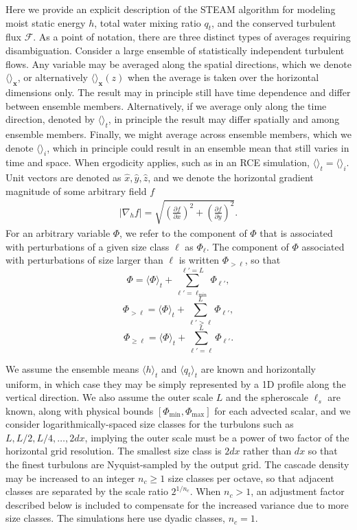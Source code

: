 \documentclass[acp, manuscript, english]{copernicus}
\begin{document}
Here we provide an explicit description of the STEAM algorithm for modeling moist static energy $h$, total water mixing ratio $q_t$, and the conserved turbulent flux $\mathcal{F}$.
As a point of notation, there are three distinct types of averages requiring disambiguation. Consider a large ensemble of statistically independent turbulent flows. Any variable may be averaged along the spatial directions, which we denote $\langle \rangle_\mathbf{x}$, or alternatively $\langle \rangle_\mathbf{x}(z)$ when the average is taken over the horizontal dimensions only. The result may in principle still have time dependence and differ between ensemble members. Alternatively, if we average only along the time direction, denoted by $\langle \rangle_t$, in principle the result may differ spatially and among ensemble members. Finally, we might average across ensemble members, which we denote $\langle \rangle_i$, which in principle could result in an ensemble mean that still varies in time and space. When ergodicity applies, such as in an RCE simulation, $\langle \rangle_t=\langle \rangle_i$. Unit vectors are denoted as $\hat{x}, \hat{y}, \hat{z}$, and we denote the horizontal gradient magnitude of some arbitrary field $f$
\begin{align}
  |\nabla_h f| = \sqrt{\left(\frac{\partial f}{\partial x}\right)^2 + \left(\frac{\partial f}{\partial y}\right)^2}.
\end{align}
For an arbitrary variable $\Phi$, we refer to the component of $\Phi$ that is associated with perturbations of a given size class $\ell$ as $\Phi_\ell$. The component of $\Phi$ associated with perturbations of size larger than $\ell$ is written $\Phi_{>\ell}$, so that 
$$\Phi = \langle \Phi \rangle_t + \sum_{\ell'=\ell_\text{min}}^{\ell'=L} \Phi_{\ell'},$$
$$\Phi_{>\ell} = \langle \Phi \rangle_t + \sum_{\ell'>\ell}^{L} \Phi_{\ell'} ,$$
$$\Phi_{\ge\ell} = \langle \Phi \rangle_t + \sum_{\ell'=\ell}^{L} \Phi_{\ell'} .$$

We assume the ensemble means $\langle h \rangle_t$ and $\langle q_t \rangle_t$ are known and horizontally uniform, in which case they may be simply represented by a 1D profile along the vertical direction. We also assume the outer scale $L$ and the spheroscale $\ell_s$ are known, along with physical bounds $[\Phi_{\min}, \Phi_{\max}]$ for each advected scalar, and we consider logarithmically-spaced size classes for the turbulons such as $L, L/2, L/4, \dots, 2dx$, implying the outer scale must be a power of two factor of the horizontal grid resolution. The smallest size class is $2dx$ rather than $dx$ so that the finest turbulons are Nyquist-sampled by the output grid. The cascade density may be increased to an integer $n_c\ge 1$ size classes per octave, so that adjacent classes are separated by the scale ratio $2^{1/n_c}$. When $n_c>1$, an adjustment factor described below is included to compensate for the increased variance due to more size classes. The simulations here use dyadic classes, $n_c = 1$.
\end{document}
